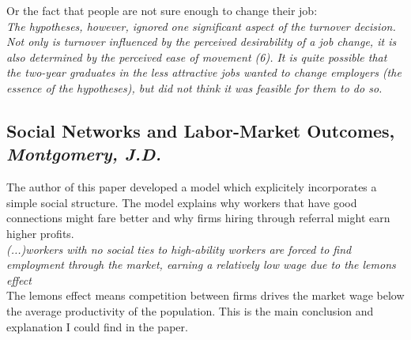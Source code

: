 \documentclass[a4paper, 11pt]{article} %
\begin{document}
Or the fact that people are not sure enough to change their job:\\

\emph{The hypotheses, however, ignored one significant 
aspect of the turnover decision. Not only is turnover influenced 
by the perceived desirability of a job change, it is also determined 
by the perceived ease of movement (6). It is quite possible that the two-year graduates in the less attractive jobs wanted to change 
employers (the essence of the hypotheses), but did not think it 
was feasible for them to do so. }\\


\subsection*{Social Networks and Labor-Market Outcomes, \emph{Montgomery, J.D.} \cite{twelveth}}
The author of this paper developed a model which explicitely incorporates a simple social structure.
The model explains why workers that have good connections might fare better and why firms hiring through referral might earn higher profits.\\

\emph{(...)workers with no social ties to high-ability workers are forced to find employment through the market, earning a relatively low wage due to the lemons effect} \\
The lemons effect means competition between firms drives the market wage below the average productivity of the population.
This is the main conclusion and explanation I could find in the paper.







\end{document}
